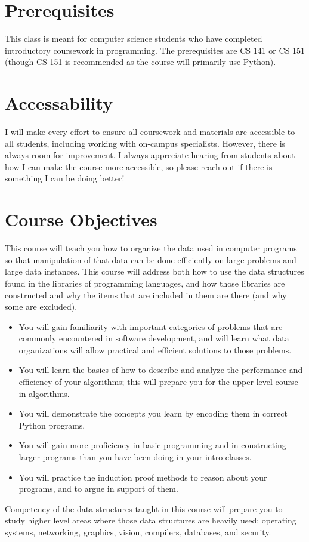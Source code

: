 \documentclass[11pt]{article}
\begin{document}
\section*{Prerequisites}

This class is meant for computer science students who have completed introductory coursework in programming. The prerequisites are CS 141 or CS 151 (though CS 151 is recommended as the course will primarily use Python).

\section*{Accessability}

I will make every effort to ensure all coursework and materials are accessible to all students, including working with on-campus specialists. However, there is always room for improvement. I always appreciate hearing from students about how I can make the course more accessible, so please reach out if there is something I can be doing better!


\section*{Course Objectives}
This course will teach you how to organize the data used in computer programs so that manipulation of that data can be done efficiently on large problems and large data instances.  This course will address both how to use the data structures found in the libraries of programming languages, and how those libraries are constructed and why the items that are included in them are there (and why some are excluded). 
\begin{itemize}
\item You will gain familiarity with important categories of problems that are commonly encountered in software development, and will learn what data organizations will allow practical and efficient solutions to those problems. 
\item You will learn the basics of how to describe and analyze the performance and efficiency of your algorithms; this will prepare you for the upper level course in algorithms. 
\item You will demonstrate the concepts you learn by encoding them in correct Python programs. 
\item You will gain more proficiency in basic programming and in constructing larger programs than you have been doing in your intro classes. 
\item You will practice the induction proof methods to reason about your programs, and to argue in support of them.  
\end{itemize}
Competency of the data structures taught in this course will prepare you to study higher level areas where those data structures are heavily used: operating systems, networking, graphics, vision, compilers, databases, and security.
\end{document}
